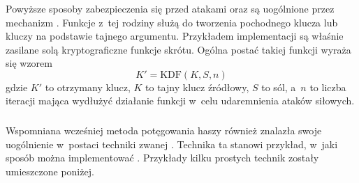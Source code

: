 \subsubsection{}
Powyższe sposoby zabezpieczenia się przed atakami  oraz 
są uogólnione przez mechanizm . Funkcje z~tej
rodziny służą do tworzenia pochodnego klucza lub kluczy na podstawie tajnego
argumentu. Przykładem implementacji  są właśnie zasilane solą
kryptograficzne funkcje skrótu. Ogólna postać takiej funkcji wyraża się wzorem
    $$K' = \mathrm{KDF}(K, S, n)$$
gdzie $K'$ to otrzymany klucz, $K$ to tajny klucz źródłowy, $S$ to sól, a~$n$
to liczba iteracji mająca wydłużyć działanie funkcji w~celu udaremnienia ataków
siłowych.

\subsubsection{}
Wspomniana wcześniej metoda potęgowania haszy również znalazła swoje
uogólnienie w~postaci techniki zwanej . Technika ta stanowi
przykład, w~jaki sposób można implementować .
Przykłady kilku prostych technik zostały umieszczone poniżej.

